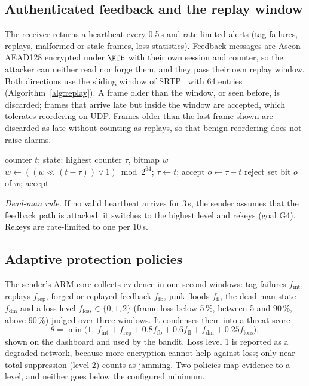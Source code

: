 \subsection{Authenticated feedback and the replay window}\label{sec:feedback}
The receiver returns a heartbeat every 0.5\,s and rate-limited alerts (tag failures, replays, malformed or stale frames, loss statistics). Feedback messages are Ascon-AEAD128 encrypted under $\Kfb$ with their own session and counter, so the attacker can neither read nor forge them, and they pass their own replay window. Both directions use the sliding window of SRTP~\cite{rfc3711} with 64 entries (Algorithm~\ref{alg:replay}). A frame older than the window, or seen before, is discarded; frames that arrive late but inside the window are accepted, which tolerates reordering on UDP. Frames older than the last frame shown are discarded as late without counting as replays, so that benign reordering does not raise alarms.

\begin{algorithm}[t]
\caption{Replay window (64 entries, after RFC~3711)}
\label{alg:replay}
\begin{algorithmic}[1]
\Require counter $t$; state: highest counter $\tau$, bitmap $w$
  \State $w \gets ((w \ll (t - \tau)) \lor 1) \bmod 2^{64}$; $\tau \gets t$; \Return accept
\EndIf
\State $o \gets \tau - t$
 \Return reject \EndIf
\State set bit $o$ of $w$; \Return accept
\end{algorithmic}
\end{algorithm}

\textit{Dead-man rule.} If no valid heartbeat arrives for 3\,s, the sender assumes that the feedback path is attacked: it switches to the highest level and rekeys (goal G4). Rekeys are rate-limited to one per 10\,s.

\subsection{Adaptive protection policies}\label{sec:policy}
The sender's ARM core collects evidence in one-second windows: tag failures $f_{\mathrm{int}}$, replays $f_{\mathrm{rep}}$, forged or replayed feedback $f_{\mathrm{fb}}$, junk floods $f_{\mathrm{fl}}$, the dead-man state $f_{\mathrm{dm}}$ and a loss level $f_{\mathrm{loss}} \in \{0, 1, 2\}$ (frame loss below 5\,\%, between 5 and 90\,\%, above 90\,\%) judged over three windows. It condenses them into a threat score
\begin{equation}
\theta = \min\bigl(1,\ f_{\mathrm{int}} + f_{\mathrm{rep}} + 0.8 f_{\mathrm{fb}} + 0.6 f_{\mathrm{fl}} + f_{\mathrm{dm}} + 0.25 f_{\mathrm{loss}}\bigr),
\label{eq:threat}
\end{equation}
shown on the dashboard and used by the bandit. Loss level 1 is reported as a degraded network, because more encryption cannot help against loss; only near-total suppression (level 2) counts as jamming. Two policies map evidence to a level, and neither goes below the configured minimum.

